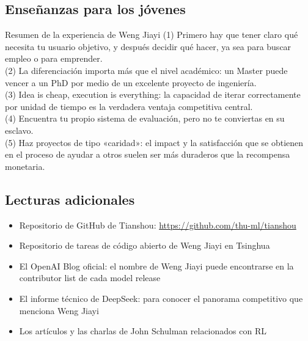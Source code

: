 \documentclass[a4paper]{article}
\begin{document}
\subsection{Enseñanzas para los jóvenes}

\begin{importantbox}{Resumen de la experiencia de Weng Jiayi}
(1) Primero hay que tener claro qué necesita tu usuario objetivo, y después decidir qué hacer, ya sea para buscar empleo o para emprender.\\
(2) La diferenciación importa más que el nivel académico: un Master puede vencer a un PhD por medio de un excelente proyecto de ingeniería.\\
(3) Idea is cheap, execution is everything: la capacidad de iterar correctamente por unidad de tiempo es la verdadera ventaja competitiva central.\\
(4) Encuentra tu propio sistema de evaluación, pero no te conviertas en su esclavo.\\
(5) Haz proyectos de tipo «caridad»: el impact y la satisfacción que se obtienen en el proceso de ayudar a otros suelen ser más duraderos que la recompensa monetaria.
\end{importantbox}

\subsection{Lecturas adicionales}

\begin{itemize}
    \item Repositorio de GitHub de Tianshou: \url{https://github.com/thu-ml/tianshou}
    \item Repositorio de tareas de código abierto de Weng Jiayi en Tsinghua
    \item El OpenAI Blog oficial: el nombre de Weng Jiayi puede encontrarse en la contributor list de cada model release
    \item El informe técnico de DeepSeek: para conocer el panorama competitivo que menciona Weng Jiayi
    \item Los artículos y las charlas de John Schulman relacionados con RL
\end{itemize}

\end{document}
